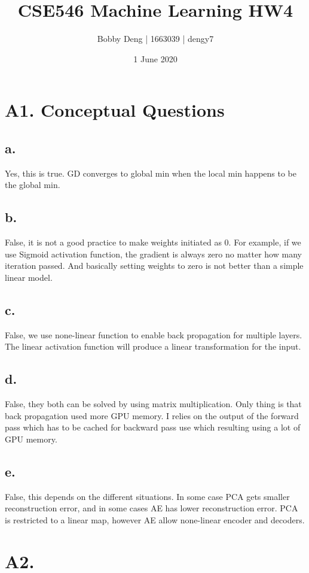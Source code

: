 \documentclass{article}
\title{CSE546 Machine Learning HW4}
\author{Bobby Deng | 1663039 | dengy7 }
\date{1 June 2020}
\begin{document}
\maketitle

\section*{A1. Conceptual Questions}
\subsection*{a.}
Yes, this is true. GD converges to global min when the local min happens to be the global min.


\subsection*{b.}
False, it is not a good practice to make weights initiated as 0. For example, if we use Sigmoid activation function, the gradient is always zero no matter how many iteration passed. And basically setting weights to zero is not better than a simple linear model.

\subsection*{c.}
False, we use none-linear function to enable back propagation for multiple layers. The linear activation function will produce a linear transformation for the input.

\subsection*{d.}
False, they both can be solved by using matrix multiplication. Only thing is that back propagation used more GPU memory. I relies on the output of the forward pass which has to be cached for backward pass use which resulting using a lot of GPU memory. 


\subsection*{e.}
False, this depends on the different situations. In some case PCA gets smaller reconstruction error, and in some cases AE has lower reconstruction error. PCA is restricted to a linear map, however AE allow none-linear encoder and decoders.

\section*{A2. }
\end{document}
